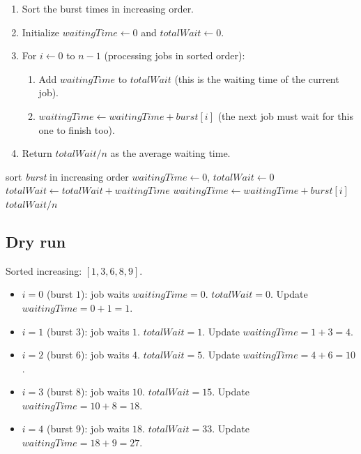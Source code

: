 \begin{enumerate}
  \item Sort the burst times in increasing order.
  \item Initialize $\textit{waitingTime} \gets 0$ and
        $\textit{totalWait} \gets 0$.
  \item For $i \gets 0$ to $n-1$ (processing jobs in sorted order):
  \begin{enumerate}
    \item Add $\textit{waitingTime}$ to $\textit{totalWait}$ (this is the
          waiting time of the current job).
    \item $\textit{waitingTime} \gets \textit{waitingTime} +
          \textit{burst}[i]$ (the next job must wait for this one to
          finish too).
  \end{enumerate}
  \item Return $\textit{totalWait} / n$ as the average waiting time.
\end{enumerate}

\begin{algorithm}[H]
\caption{Shortest Job First Scheduling}
\begin{algorithmic}[1]
  \State sort \textit{burst} in increasing order
  \State $\textit{waitingTime} \gets 0$, $\textit{totalWait} \gets 0$
    \State $\textit{totalWait} \gets \textit{totalWait} + \textit{waitingTime}$
    \State $\textit{waitingTime} \gets \textit{waitingTime} + \textit{burst}[i]$
  \EndFor
  \State \Return $\textit{totalWait} / n$
\EndProcedure
\end{algorithmic}
\end{algorithm}

\subsection*{Dry run}


Sorted increasing: $[1, 3, 6, 8, 9]$.

\begin{itemize}
  \item $i=0$ (burst $1$): job waits $\textit{waitingTime}=0$.
        $\textit{totalWait}=0$. Update $\textit{waitingTime}=0+1=1$.
  \item $i=1$ (burst $3$): job waits $1$. $\textit{totalWait}=1$. Update
        $\textit{waitingTime}=1+3=4$.
  \item $i=2$ (burst $6$): job waits $4$. $\textit{totalWait}=5$. Update
        $\textit{waitingTime}=4+6=10$.
  \item $i=3$ (burst $8$): job waits $10$. $\textit{totalWait}=15$. Update
        $\textit{waitingTime}=10+8=18$.
  \item $i=4$ (burst $9$): job waits $18$. $\textit{totalWait}=33$. Update
        $\textit{waitingTime}=18+9=27$.
\end{itemize}

